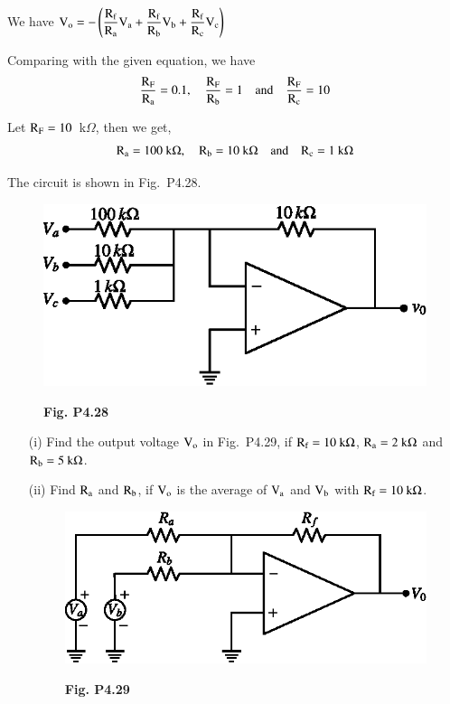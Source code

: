 \begin{solution}
We have $\textrm{V}_{\textrm{o}}=-\left(\dfrac{\textrm{R}_{\textrm{f}}}{\textrm{R}_{\textrm{a}}}\textrm{V}_{\textrm{a}}+\dfrac{\textrm{R}_{\textrm{f}}}{\textrm{R}_{\textrm{b}}}\textrm{V}_{\textrm{b}}+\dfrac{\textrm{R}_{\textrm{f}}}{\textrm{R}_{\textrm{c}}}\textrm{V}_{\textrm{c}}\right)$

\smallskip
Comparing with the given equation, we have
$$
\dfrac{\textrm{R}_{\textrm{F}}}{\textrm{R}_{\textrm{a}}}=0.1,\quad \dfrac{\textrm{R}_{\textrm{F}}}{\textrm{R}_{\textrm{b}}}=1\quad\text{and}\quad \dfrac{\textrm{R}_{\textrm{F}}}{\textrm{R}_{\textrm{c}}}=10
$$

Let $\textrm{R}_{\textrm{F}}=10$~k$\Omega$, then we get,
$$
\textrm{R}_{\textrm{a}}=100~\textrm{k}\Omega,\quad \textrm{R}_{\textrm{b}}=10~\textrm{k}\Omega\quad\text{and}\quad \textrm{R}_{\textrm{c}}=1~\textrm{k}\Omega
$$

\eject

The circuit is shown in Fig.~P4.28.
\begin{figure}[H]
\centering
\includegraphics[scale=.95]{chap4/figP4.27.eps}

\smallskip
{\bf Fig. P4.28}
\end{figure}
\end{solution}

\begin{problem}\label{prob4.29}
\begin{itemize}
\item[(i)] Find the output voltage $\textrm{V}_{\textrm{o}}$ in Fig.~P4.29, if $\textrm{R}_{\textrm{f}}=10~\textrm{k}\Omega$, $\textrm{R}_{\textrm{a}}=2~\textrm{k}\Omega$ and $\textrm{R}_{\textrm{b}}=5~\textrm{k}\Omega$.

\item[(ii)] Find $\textrm{R}_{\textrm{a}}$ and $\textrm{R}_{\textrm{b}}$, if $\textrm{V}_{\textrm{o}}$ is the average of $\textrm{V}_{\textrm{a}}$ and $\textrm{V}_{\textrm{b}}$ with $\textrm{R}_{\textrm{f}}=10~\textrm{k}\Omega$.
\begin{figure}[H]
\centering
\includegraphics[scale=.95]{chap4/figP4.28.eps}

\smallskip
{\bf Fig. P4.29}
\end{figure}
\end{itemize}
\end{problem}

